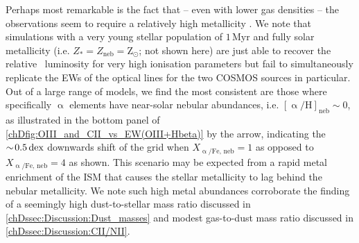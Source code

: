 Perhaps most remarkable is the fact that -- even with lower gas densities -- the observations seem to require a relatively high metallicity \citep[in line with the findings of][]{2020ApJ...896...93H}. We note that simulations with a very young stellar population of $1 \, \mathrm{Myr}$ and fully solar metallicity (i.e. $Z_* = Z_\text{neb} = \mathrm{Z_\odot}$; not shown here) are just able to recover the relative \OIIILam\ luminosity for very high ionisation parameters but fail to simultaneously replicate the EWs of the optical lines for the two COSMOS sources in particular. Out of a large range of models, we find the most consistent are those where specifically $\upalpha$ elements have near-solar nebular abundances, i.e. $[ \mathrm{\upalpha/H} ]_\text{neb} \sim 0$, as illustrated in the bottom panel of \cref{chDfig:OIII_and_CII_vs_EW(OIII+Hbeta)} by the arrow, indicating the $\sim \! 0.5 \, \mathrm{dex}$ downwards shift of the grid when $X_\mathrm{\upalpha/Fe, \, neb} = 1$ as opposed to $X_\mathrm{\upalpha/Fe, \, neb} = 4$ as shown. This scenario may be expected from a rapid metal enrichment of the ISM that causes the stellar metallicity to lag behind the nebular metallicity. We note such high metal abundances corroborate the finding of a seemingly high dust-to-stellar mass ratio discussed in \cref{chDssec:Discussion:Dust_masses} and modest gas-to-dust mass ratio discussed in \cref{chDssec:Discussion:CII/NII}.
